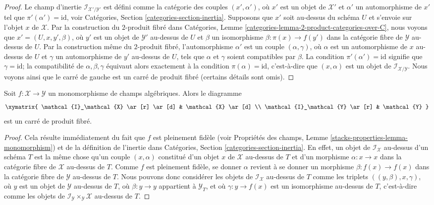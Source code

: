 \begin{proof}
Le champ d'inertie $\mathcal{I}_{\mathcal{X}'/\mathcal{Y}'}$ est défini
comme la catégorie des couples $(x', \alpha')$, où $x'$ est un objet de
$\mathcal{X}'$ et $\alpha'$ un automorphisme de $x'$ tel que
$\pi'(\alpha') = \text{id}$, voir Catégories, Section
\ref{categories-section-inertia}. Supposons que $x'$ soit au-dessus du
schéma $U$ et s'envoie sur l'objet $x$ de $\mathcal{X}$. Par la construction
du $2$-produit fibré dans Catégories, Lemme
\ref{categories-lemma-2-product-categories-over-C}, nous voyons que
$x' = (U, x, y', \beta)$, où $y'$ est un objet de $\mathcal{Y}'$ au-dessus
de $U$ et $\beta$ un isomorphisme
$\beta : \pi(x) \to f(y')$ dans la catégorie fibre de $\mathcal{Y}$
au-dessus de $U$. Par la construction même du $2$-produit fibré,
l'automorphisme $\alpha'$ est un couple $(\alpha, \gamma)$, où $\alpha$ est
un automorphisme de $x$ au-dessus de $U$ et $\gamma$ un automorphisme de
$y'$ au-dessus de $U$, tels que $\alpha$ et $\gamma$ soient compatibles par
$\beta$. La condition $\pi'(\alpha') = \text{id}$ signifie que
$\gamma = \text{id}$; la compatibilité de $\alpha, \beta, \gamma$ équivaut
alors exactement à la condition $\pi(\alpha) = \text{id}$, c'est-à-dire que
$(x, \alpha)$ est un objet de $\mathcal{I}_{\mathcal{X}/\mathcal{Y}}$.
Nous voyons ainsi que le carré de gauche est un carré de produit fibré
(certains détails sont omis).
\end{proof}

\begin{lemma}
\label{lemma-monomorphism-cartesian-square-inertia}
Soit $f : \mathcal{X} \to \mathcal{Y}$ un monomorphisme de champs
algébriques. Alors le diagramme
$$
\xymatrix{
\mathcal{I}_\mathcal{X} \ar[r] \ar[d] &
\mathcal{X} \ar[d] \\
\mathcal{I}_\mathcal{Y} \ar[r] &
\mathcal{Y}
}
$$
est un carré de produit fibré.
\end{lemma}

\begin{proof}
Cela résulte immédiatement du fait que $f$ est pleinement fidèle (voir
Propriétés des champs, Lemme
\ref{stacks-properties-lemma-monomorphism}) et de la définition de l'inertie
dans Catégories, Section \ref{categories-section-inertia}. En effet, un objet
de $\mathcal{I}_\mathcal{X}$ au-dessus d'un schéma $T$ est la même chose
qu'un couple $(x, \alpha)$ constitué d'un objet $x$ de $\mathcal{X}$
au-dessus de $T$ et d'un morphisme $\alpha : x \to x$ dans la catégorie
fibre de $\mathcal{X}$ au-dessus de $T$. Comme $f$ est pleinement fidèle,
se donner $\alpha$ revient à se donner un morphisme
$\beta : f(x) \to f(x)$ dans la catégorie fibre de $\mathcal{Y}$ au-dessus
de $T$. Nous pouvons donc considérer les objets de
$\mathcal{I}_\mathcal{X}$ au-dessus de $T$ comme les triplets
$((y, \beta), x, \gamma)$, où $y$ est un objet de $\mathcal{Y}$ au-dessus
de $T$, où $\beta : y \to y$ appartient à $\mathcal{Y}_T$, et où
$\gamma : y \to f(x)$ est un isomorphisme au-dessus de $T$, c'est-à-dire
comme les objets de $\mathcal{I}_\mathcal{Y} \times_\mathcal{Y}
\mathcal{X}$ au-dessus de $T$.
\end{proof}

